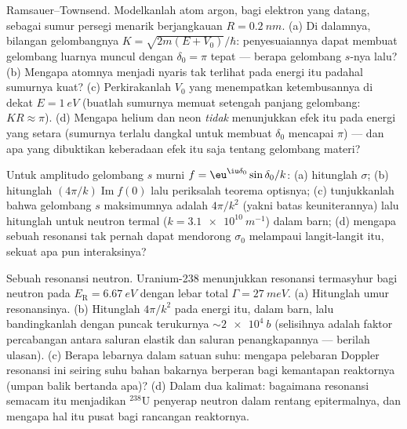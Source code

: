 \begin{exercise}[$\star\star$]\label{exo:b3:scattering-theory:8}
Ramsauer--Townsend. Modelkanlah atom argon, bagi elektron yang datang,
sebagai sumur persegi menarik berjangkauan $R =
\qty{0.2}{nm}$. (a) Di dalamnya, bilangan gelombangnya $K =
\sqrt{2m(E + V_0)}/\hbar$:
penyesuaiannya dapat membuat gelombang luarnya muncul dengan $\delta_0 = \pi$
tepat --- berapa  gelombang $s$-nya lalu? (b) Mengapa
atomnya menjadi nyaris tak terlihat pada energi itu padahal sumurnya
kuat? (c) Perkirakanlah $V_0$ yang menempatkan ketembusannya di dekat
$E = \qty{1}{eV}$ (buatlah sumurnya memuat setengah panjang gelombang:
$KR \approx \pi$). (d) Mengapa helium dan neon \emph{tidak} menunjukkan
efek itu pada energi yang setara (sumurnya terlalu dangkal untuk membuat
$\delta_0$ mencapai $\pi$) --- dan apa yang dibuktikan keberadaan efek
itu saja tentang gelombang materi?
\end{exercise}

\begin{exercise}[$\star\star$]\label{exo:b3:scattering-theory:9}
Untuk amplitudo gelombang $s$ murni $f = \eu^{\iu\delta_0}\sin\delta_0/
k$: (a) hitunglah $\sigma$; (b) hitunglah $(4\pi/k)\operatorname{Im}
f(0)$ lalu periksalah teorema optisnya; (c) tunjukkanlah bahwa  gelombang $s$ maksimumnya adalah $4\pi/k^2$ (yakni batas
keuniterannya) lalu hitunglah untuk neutron termal ($k = \qty{3.1e10}{m^{-1}}$)
dalam barn; (d) mengapa sebuah resonansi tak pernah dapat mendorong
$\sigma_0$ melampaui langit-langit itu, sekuat apa pun interaksinya?
\end{exercise}

\begin{exercise}[$\star\star\star$]\label{exo:b3:scattering-theory:10}
Sebuah resonansi neutron. Uranium-238 menunjukkan resonansi termasyhur
bagi neutron pada $E_{\text{R}} = \qty{6.67}{eV}$ dengan lebar total
$\Gamma = \qty{27}{meV}$. (a) Hitunglah umur resonansinya.
(b) Hitunglah $4\pi/k^2$ pada energi itu, dalam barn, lalu bandingkanlah
dengan puncak terukurnya $\sim\qty{2e4}{b}$ (selisihnya adalah faktor
percabangan antara saluran elastik dan saluran penangkapannya ---
berilah ulasan). (c) Berapa lebarnya dalam satuan suhu: mengapa
pelebaran Doppler resonansi ini seiring suhu bahan bakarnya berperan
bagi kemantapan reaktornya (umpan balik bertanda apa)? (d) Dalam dua
kalimat: bagaimana resonansi semacam itu menjadikan $^{238}$U penyerap
neutron dalam rentang epitermalnya, dan mengapa hal itu pusat bagi
rancangan reaktornya.
\end{exercise}


